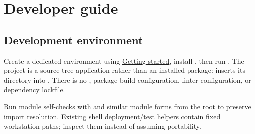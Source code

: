 \chapter{Developer guide}\label{chapter-13}
\section*{Development environment}
Create a dedicated environment using \hyperref[chapter-2]{Getting started}, install , then run . The project is a source-tree application rather than an installed package:  inserts its directory into . There is no , package build configuration, linter configuration, or dependency lockfile.

Run module self-checks with  and similar module forms from the root to preserve import resolution. Existing shell deployment/test helpers contain fixed workstation paths; inspect them instead of assuming portability.

